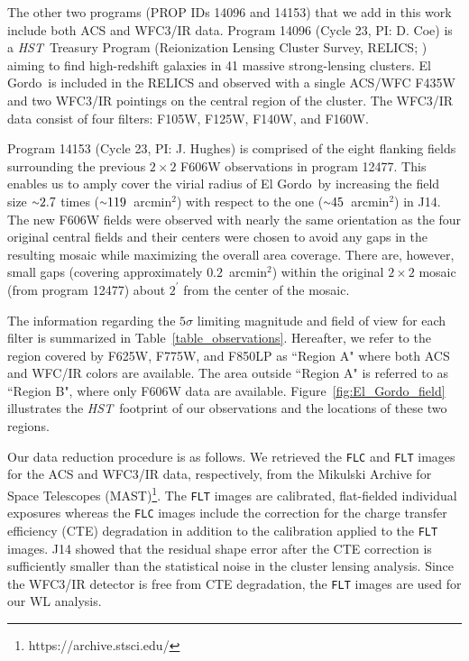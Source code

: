 \documentclass[twocolumn]{aastex631}
\newcommand{\elgordo}{El Gordo}
\newcommand{\HST}{{\it HST}}
\newcommand{\mytilde}{\raise.19ex\hbox{$\scriptstyle\sim$}}
\newcommand{\sqarcmin}{arcmin$^{2}$}
\begin{document}
The other two programs (PROP IDs 14096 and 14153) that we add in this work include both ACS and WFC3/IR data. 
Program 14096 (Cycle 23, PI: D. Coe) is a \HST~Treasury Program (Reionization Lensing Cluster Survey, RELICS; \citealt{RELICS}) aiming to find high-redshift galaxies in 41 massive strong-lensing clusters. 
\elgordo~is included in the RELICS and observed with a single ACS/WFC F435W and two WFC3/IR pointings on the central region of the cluster. The WFC3/IR data consist of four filters: F105W, F125W, F140W, and F160W.


Program 14153 (Cycle 23, PI: J. Hughes) is comprised of the eight flanking fields surrounding the previous $2\times2$ F606W observations in program 12477. 
This enables us to amply cover the virial radius of \elgordo~by increasing the field size $\mytilde2.7$ times ($\mytilde119$~\sqarcmin) with respect to the one ($\mytilde45$~\sqarcmin) in J14. 
The new F606W fields were observed with nearly the same orientation as the four original central fields and their centers were chosen to avoid any gaps in the resulting mosaic while maximizing the overall area coverage. 
There are, however, small gaps (covering approximately $0.2$~\sqarcmin) within the original $2\times2$ mosaic (from program 12477) about $2^\prime$ from the center of the mosaic.


The information regarding the $5\sigma$ limiting magnitude and field of view for each filter is summarized in Table~\ref{table_observations}. 
Hereafter, we refer to the region covered by F625W, F775W, and F850LP as ``Region A" where both ACS and WFC/IR colors are available. The area outside ``Region A" is referred to as ``Region B", where only F606W data are available. 
Figure~\ref{fig:El_Gordo_field} illustrates the \HST~footprint of our observations and the locations of these two regions. 


Our data reduction procedure is as follows. 
We retrieved the {\tt FLC} and {\tt FLT} images for the ACS and WFC3/IR data, respectively, from the Mikulski Archive for Space Telescopes (MAST)\footnote{https://archive.stsci.edu/}. 
The {\tt FLT} images are calibrated, flat-fielded individual exposures whereas the {\tt FLC} images include the correction for the charge transfer efficiency (CTE) degradation in addition to the calibration applied to the {\tt FLT} images.
J14 showed that the residual shape error after the CTE correction is sufficiently smaller than the statistical noise in the cluster lensing analysis. 
Since the WFC3/IR detector is free from CTE degradation, the {\tt FLT} images are used for our WL analysis.
\end{document}
